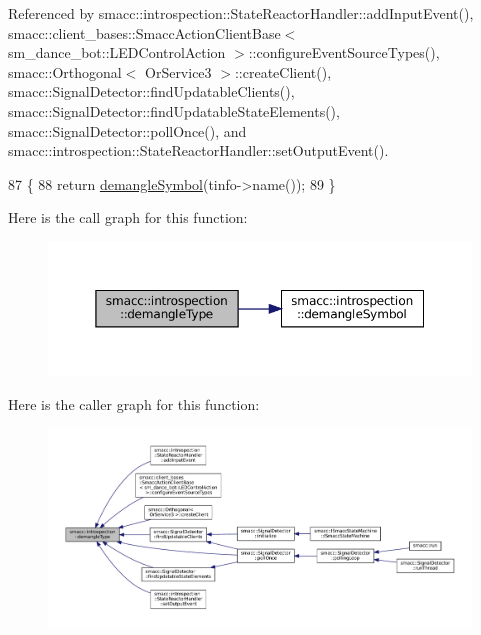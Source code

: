 Referenced by smacc\+::introspection\+::\+State\+Reactor\+Handler\+::add\+Input\+Event(), smacc\+::client\+\_\+bases\+::\+Smacc\+Action\+Client\+Base$<$ sm\+\_\+dance\+\_\+bot\+::\+L\+E\+D\+Control\+Action $>$\+::configure\+Event\+Source\+Types(), smacc\+::\+Orthogonal$<$ Or\+Service3 $>$\+::create\+Client(), smacc\+::\+Signal\+Detector\+::find\+Updatable\+Clients(), smacc\+::\+Signal\+Detector\+::find\+Updatable\+State\+Elements(), smacc\+::\+Signal\+Detector\+::poll\+Once(), and smacc\+::introspection\+::\+State\+Reactor\+Handler\+::set\+Output\+Event().


\begin{DoxyCode}
87 \{
88     \textcolor{keywordflow}{return} \hyperlink{namespacesmacc_1_1introspection_aa9158a0ff0cfe83a59877e6af7d7f873}{demangleSymbol}(tinfo->name());
89 \}
\end{DoxyCode}
Here is the call graph for this function\+:
\nopagebreak
\begin{figure}[H]
\begin{center}
\leavevmode
\includegraphics[width=350pt]{namespacesmacc_1_1introspection_a670e39ccea29952859df4e2d0e45077b_cgraph}
\end{center}
\end{figure}
Here is the caller graph for this function\+:
\nopagebreak
\begin{figure}[H]
\begin{center}
\leavevmode
\includegraphics[width=350pt]{namespacesmacc_1_1introspection_a670e39ccea29952859df4e2d0e45077b_icgraph}
\end{center}
\end{figure}
\mbox{\label{namespacesmacc_1_1introspection_a81ad2fc77a0262640d4b1bd273938603}} 
